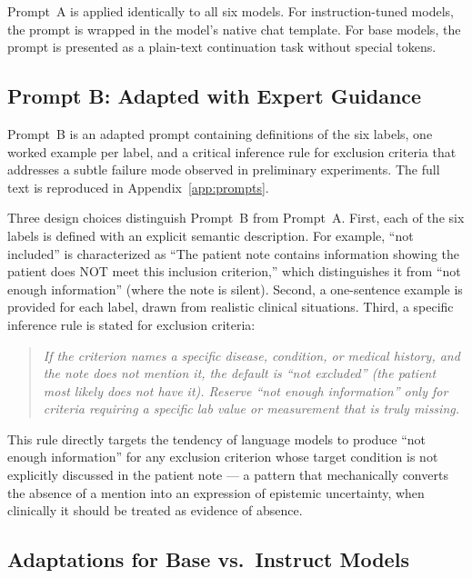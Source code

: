 Prompt~A is applied identically to all six models. For instruction-tuned 
models, the prompt is wrapped in the model's native chat template. For base 
models, the prompt is presented as a plain-text continuation task without 
special tokens.

\subsection{Prompt B: Adapted with Expert Guidance}
\label{subsec:met-prompt-b}

Prompt~B is an adapted prompt containing definitions of the six labels, 
one worked example per label, and a critical inference rule for exclusion 
criteria that addresses a subtle failure mode observed in preliminary 
experiments. The full text is reproduced in Appendix~\ref{app:prompts}.

Three design choices distinguish Prompt~B from Prompt~A. First, each of the 
six labels is defined with an explicit semantic description. For example, 
``not included'' is characterized as ``The patient note contains 
information showing the patient does NOT meet this inclusion criterion,'' 
which distinguishes it from ``not enough information'' (where the note is 
silent). Second, a one-sentence example is provided for each label, drawn 
from realistic clinical situations. Third, a specific inference rule is 
stated for exclusion criteria:

\begin{quote}
\itshape
If the criterion names a specific disease, condition, or medical history, 
and the note does not mention it, the default is ``not excluded'' (the 
patient most likely does not have it). Reserve ``not enough information'' 
only for criteria requiring a specific lab value or measurement that is 
truly missing.
\end{quote}

This rule directly targets the tendency of language models to produce 
``not enough information'' for any exclusion criterion whose target 
condition is not explicitly discussed in the patient note --- a pattern 
that mechanically converts the absence of a mention into an expression of 
epistemic uncertainty, when clinically it should be treated as evidence of 
absence.

\subsection{Adaptations for Base vs.\ Instruct Models}
\label{subsec:met-base-instruct}

